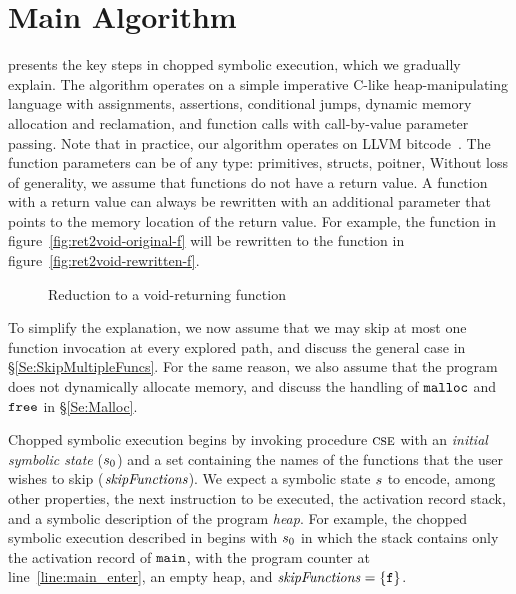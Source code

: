 
\section{Main Algorithm}\label{section:main-algorithm}

%

 presents the key steps in chopped
symbolic execution, which we gradually explain. The algorithm operates
on a simple imperative C-like heap-manipulating language with
assignments, assertions, conditional jumps, dynamic memory allocation
and reclamation, and function calls with call-by-value parameter
passing.
Note that in practice, our algorithm operates on LLVM bitcode~\cite{llvm}.
The function parameters can be of any type: primitives, structs, poitner, \etc
Without loss of generality, we assume that functions do not have a return value.
A function with a return value can always be rewritten with an additional parameter 
that points to the memory location of the return value.
For example, the function in figure~\ref{fig:ret2void-original-f}
will be rewritten to the function in figure~\ref{fig:ret2void-rewritten-f}.
\begin{figure*}[t]
  \centering
  \subfloat[]{
    
    \label{fig:ret2void-original-f}
  }
  
  \subfloat[]{
    
    \label{fig:ret2void-rewritten-f}
  }

  \caption{Reduction to a void-returning function}
  \label{fig:simple}
\end{figure*}

To simplify the explanation, we now
assume that we may skip at most one function invocation at every
explored path, and discuss the general case in
\S\ref{Se:SkipMultipleFuncs}. For the same reason, we also assume that
the program does not dynamically allocate memory, and discuss the
handling of $\texttt{malloc}$ and $\texttt{free}$ in \S\ref{Se:Malloc}.

Chopped symbolic execution begins by invoking procedure $\textsc{cse}$
with an \emph{initial symbolic state} ($s_0$) and a set
containing the names of the functions that the user wishes to skip
($\mathit{skipFunctions}$). We expect a symbolic state $s$ to encode,
among other properties, the next instruction to be executed, the activation record stack,
and a symbolic description of the program \emph{heap}. For example, the
chopped symbolic execution described in  begins
with $s_0$ in which the stack contains only the activation record
of $\texttt{main}$, with the program counter at
line~\ref{line:main_enter}, an empty heap, and
$\mathit{skipFunctions} = \{ \texttt{f} \}$.

